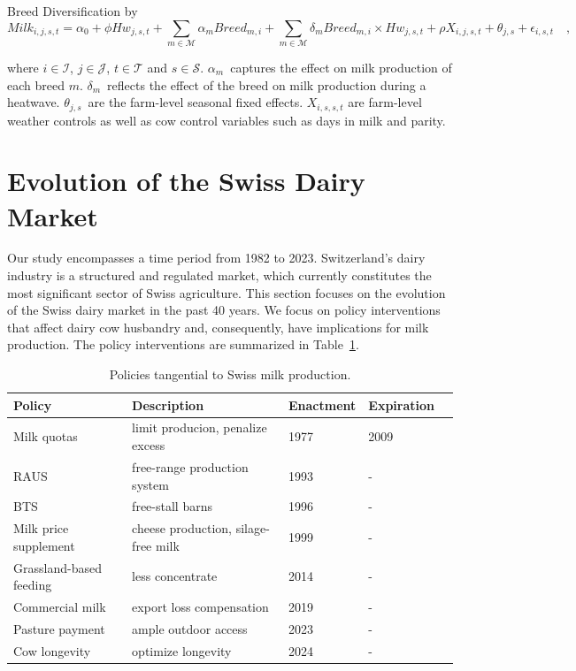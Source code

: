 \begin{defi} Breed Diversification by \cite{ahmed_temperature_2022}
    \begin{equation}
    \textit{Milk}_{i,j,s,t} = \alpha_0 + \phi \textit{Hw}_{j,s,t} + \sum_{m \in \mathcal{M}} \alpha_m \textit{Breed}_{m,i} + \sum_{m \in \mathcal{M}} \delta_m \textit{Breed}_{m,i} \times \textit{Hw}_{j,s,t} +  \rho X_{i,j,s,t} + \theta_{j,s} + \epsilon_{i,s,t}\quad ,
\end{equation}
\end{defi}

 where $i \in \mathcal{I}$, $j \in \mathcal{J}$, $t \in \mathcal{T}$ and $s \in \mathcal{S}$. $\alpha_m$~captures the effect on milk production of each breed $m$. $\delta_m$~reflects the effect of the breed on milk production during a heatwave. $\theta_{j,s}$~are the farm-level seasonal fixed effects. $X_{i,s,s,t}$ are farm-level weather controls as well as cow control variables such as days in milk and parity.

\section{Evolution of the Swiss Dairy Market}\label{sec:evolution_market}
Our study encompasses a time period from 1982 to 2023. Switzerland's dairy industry is a structured and regulated market, which currently constitutes the most significant sector of Swiss agriculture. This section focuses on the evolution of the Swiss dairy market in the past 40 years. We focus on policy interventions that affect dairy cow husbandry and, consequently, have implications for milk production. The policy interventions are summarized in Table~\ref{table:policies}.

\begin{table}[H]
\centering
\begin{tabular}{p{4cm}p{5cm}m{2cm}m{2cm}c}
    \textbf{Policy} & \textbf{Description} & \textbf{Enactment} & \textbf{Expiration}\\
    \hline
    \hline
    Milk quotas & limit producion, penalize excess & 1977 & 2009 \\
    \hline
    RAUS & free-range production system & 1993 & -\\
    \hline
    BTS & free-stall barns & 1996 & -\\
    \hline
    Milk price supplement & cheese production, silage-free milk & 1999 & -\\
    \hline
    Grassland-based feeding & less concentrate & 2014 & -\\
    \hline
    Commercial milk & export loss compensation & 2019 & -\\
    \hline
    Pasture payment & ample outdoor access & 2023 & -\\
    \hline
    Cow longevity & optimize longevity  & 2024 & -\\
    \end{tabular}
    \caption{Policies tangential to Swiss milk production.}
    \label{table:policies}
\end{table}

